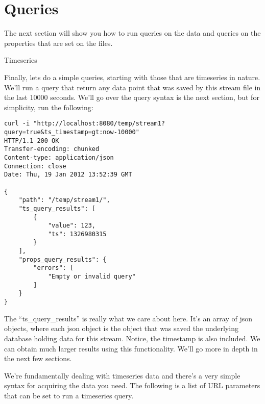 \section{Queries}

The next section will show you how to run queries on the data and queries on the properties that are set on the files.

Timeseries

Finally, lets do a simple queries, starting with those that are timeseries in nature. We'll run a query that return any data point that was saved by this stream file in the last 10000 seconds. We'll go over the query syntax is the next section, but for simplicity, run the following:

\begin{lstlisting}
curl -i "http://localhost:8080/temp/stream1?query=true&ts_timestamp=gt:now-10000"
HTTP/1.1 200 OK
Transfer-encoding: chunked
Content-type: application/json
Connection: close
Date: Thu, 19 Jan 2012 13:52:39 GMT

{
    "path": "/temp/stream1/",
    "ts_query_results": [
        {
            "value": 123,
            "ts": 1326980315
        }
    ],
    "props_query_results": {
        "errors": [
            "Empty or invalid query"
        ]
    }
}
\end{lstlisting}

The ``ts\_query\_results'' is really what we care about here. It's an array of json objects, where each json object is the object that was saved the underlying database holding data for this stream. Notice, the timestamp is also included. We can obtain much larger results using this functionality. We'll go more in depth in the next few sections.

We're fundamentally dealing with timeseries data and there's a very simple syntax for acquiring the data you need. The following is a list of URL parameters that can be set to run a timeseries query.


